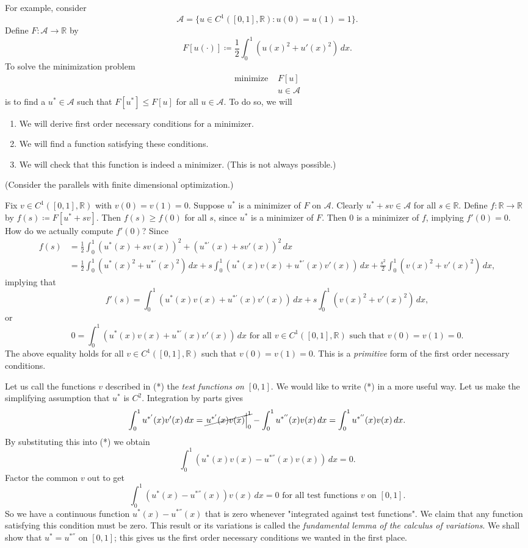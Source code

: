 \documentclass[11pt]{book}
\newcommand{\R}{\mathbb{R}}
\begin{document}
For example, consider
\[
\mathcal{A} = \{ u \in C^1([0, 1], \R) : u(0) = u(1) = 1  \}.
\]
Define $F : \mathcal{A} \to \R$ by
\[
F[u(\cdot)] \coloneqq \frac{1}{2} \int_0^1 (u(x)^2 + u'(x)^2) \, dx.
\]
To solve the minimization problem
\begin{align*}
\text{minimize } &F[u] \\
&u \in \mathcal{A}
\end{align*}
is to find a $u^* \in \mathcal{A}$ such that $F[u^*] \leq F[u]$ for all $u \in \mathcal{A}$. To do so, we will
\begin{enumerate}
\item
We will derive first order necessary conditions for a minimizer.
\item
We will find a function satisfying these conditions.
\item
We will check that this function is indeed a minimizer. (This is not always possible.)
\end{enumerate}
(Consider the parallels with finite dimensional optimization.)

Fix $v \in C^1([0,1],\R)$ with $v(0) = v(1) = 0$. Suppose $u^*$ is a minimizer of $F$ on $\mathcal{A}$. Clearly $u^* + sv \in \mathcal{A}$ for all $s \in \R$. Define $f : \R \to \R$ by $f(s) \coloneqq F[u^* + sv]$. Then $f(s) \geq f(0)$ for all $s$, since $u^*$ is a minimizer of $F$. Then $0$ is a minimizer of $f$, implying $f'(0) = 0$. How do we actually compute $f'(0)$? Since
\begin{align*}
f(s) &= \frac{1}{2} \int_0^1 (u^*(x) + sv(x))^2 + (u^{*'}(x) + sv'(x))^2 \, dx \\
&= \frac{1}{2} \int_0^1 (u^*(x)^2 + u^{*'}(x)^2) \, dx + s\int_0^1 ( u^*(x)v(x) + u^{*'}(x)v'(x) ) \, dx + \frac{s^2}{2} \int_0^1 (v(x)^2 + v'(x)^2) \, dx,
\end{align*}
implying that
\[
f'(s) = \int_0^1 ( u^*(x)v(x) + u^{*'}(x)v'(x) ) \, dx + s\int_0^1 (v(x)^2 + v'(x)^2) \, dx,
\]
or
\[
\tag{*}
0 = \int_0^1 ( u^*(x)v(x) + u^{*'}(x)v'(x) ) \, dx \text{ for all } v \in C^1([0,1], \R) \text{ such that } v(0)=v(1)=0.
\]
The above equality holds for all $v \in C^1([0,1], \R)$ such that $v(0)=v(1)=0$. This is a \emph{primitive} form of the first order necessary conditions.

Let us call the functions $v$ described in (*) the \emph{test functions on $[0,1]$}. We would like to write (*) in a more useful way. Let us make the simplifying assumption that $u^*$ is $C^2$. Integration by parts gives
\[
\int_0^1 u^{*'}(x)v'(x) \, dx = \cancel{\left. u^{*'}(x)v(x) \right|_0^1} - \int_0^1 u^{*''}(x) v(x) \, dx = \int_0^1 u^{*''}(x) v(x) \, dx.
\]
By substituting this into (*) we obtain
\[
\int_0^1 (u^*(x)v(x) - u^{*''}(x)v(x))\, dx = 0.
\]
Factor the common $v$ out to get
\[
\int_0^1 (u^*(x) - u^{*''}(x))v(x) \, dx = 0 \text{ for all test functions } v \text{ on } [0,1].
\]
So we have a continuous function $u^*(x) - u^{*''}(x)$ that is zero whenever "integrated against test functions". We claim that any function satisfying this condition must be zero. This result or its variations is called the \emph{fundamental lemma of the calculus of variations}. We shall show that $u^* = u^{*''}$ on $[0,1]$; this gives us the first order necessary conditions we wanted in the first place.
\end{document}
